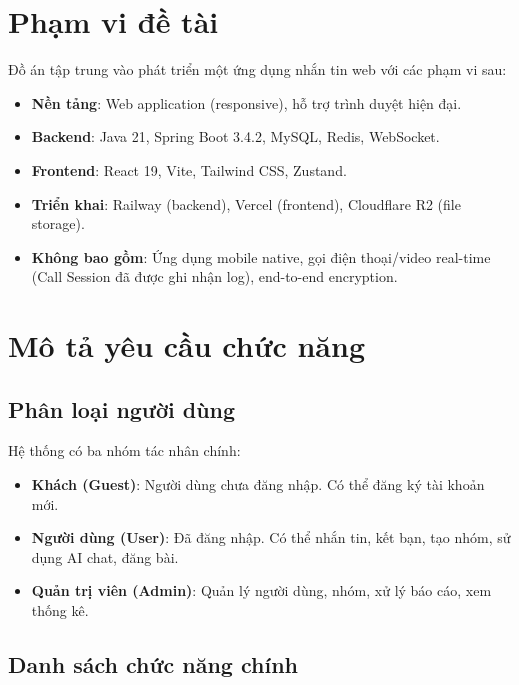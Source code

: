 \documentclass[12pt,a4paper]{report}
\begin{document}
\section{Phạm vi đề tài}

Đồ án tập trung vào phát triển một ứng dụng nhắn tin web với các phạm vi sau:

\begin{itemize}
    \item \textbf{Nền tảng}: Web application (responsive), hỗ trợ trình duyệt hiện đại.
    \item \textbf{Backend}: Java 21, Spring Boot 3.4.2, MySQL, Redis, WebSocket.
    \item \textbf{Frontend}: React 19, Vite, Tailwind CSS, Zustand.
    \item \textbf{Triển khai}: Railway (backend), Vercel (frontend), Cloudflare R2 (file storage).
    \item \textbf{Không bao gồm}: Ứng dụng mobile native, gọi điện thoại/video real-time (Call Session đã được ghi nhận log), end-to-end encryption.
\end{itemize}

\section{Mô tả yêu cầu chức năng}

\subsection{Phân loại người dùng}

Hệ thống có ba nhóm tác nhân chính:

\begin{itemize}
    \item \textbf{Khách (Guest)}: Người dùng chưa đăng nhập. Có thể đăng ký tài khoản mới.
    \item \textbf{Người dùng (User)}: Đã đăng nhập. Có thể nhắn tin, kết bạn, tạo nhóm, sử dụng AI chat, đăng bài.
    \item \textbf{Quản trị viên (Admin)}: Quản lý người dùng, nhóm, xử lý báo cáo, xem thống kê.
\end{itemize}

\subsection{Danh sách chức năng chính}
\end{document}
